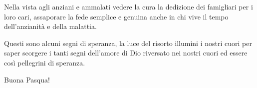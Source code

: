 Nella vista agli anziani e ammalati vedere la cura la dedizione dei famigliari per i loro cari, assaporare la fede semplice e genuina anche in chi vive il tempo dell'anzianità e della malattia.

Questi sono alcuni segni di speranza, la luce del risorto illumini i nostri cuori per saper scorgere i tanti segni dell'amore di Dio riversato nei nostri cuori ed essere così pellegrini di speranza.

Buona Pasqua!


